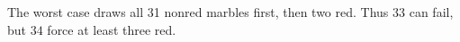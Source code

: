 The worst case draws all 31 nonred marbles first, then two red. Thus 33 can fail, but $\boxed{34}$ force at least three red.

